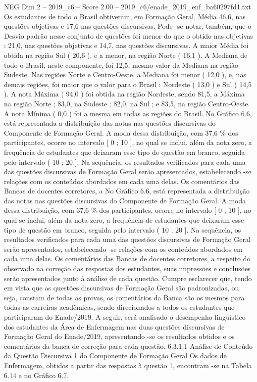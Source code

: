 \begin{textsample}{NEG Dim 2 – 2019\_c6 – Score 2.00 – 2019\_c6/enade\_2019\_enf\_ba60297fd1.txt}
Os estudantes de todo o Brasil obtiveram, em Formação Geral, Média 46,6, nas questões objetivas e 17,6 nas questões discursivas.
Pode -se notar, também, que o Desvio padrão nesse conjunto de questões foi menor do que o obtido nas objetivas : 21,0, nas questões objetivas e 14,7, nas questões discursivas.
A maior Média foi obtida na região Sul ( 20,6 ), e a menor, na região Norte ( 16,1 ).
A Mediana de todo o Brasil, neste componente, foi 12,5, mesmo valor da Mediana na região Sudeste.
Nas regiões Norte e Centro-Oeste, a Mediana foi menor ( 12,0 ), e, nas demais regiões, foi maior que o valor para o Brasil : Nordeste ( 13,0 ) e Sul ( 14,5 ).
A nota Máxima ( 94,0 ) foi obtida na região Nordeste, sendo 81,5, a Máxima na região Norte ; 83,0, na Sudeste ; 82,0, na Sul ; e 83,5, na região Centro-Oeste.
A nota Mínima ( 0,0 ) foi a mesma em todas as regiões do Brasil.
No Gráfico 6.6, está representada a distribuição das notas nas questões discursivas do Componente de Formação Geral.
A moda dessa distribuição, com 37,6 \% dos participantes, ocorre no intervalo [ 0 ; 10 ], no qual se inclui, além da nota zero, a frequência de estudantes que deixaram esse tipo de questão em branco, seguida pelo intervalo ( 10 ; 20 ].
Na sequência, os resultados verificados para cada uma das questões discursivas de Formação Geral serão apresentados, estabelecendo -se relações com os conteúdos abordados em cada uma delas.
Os comentários das Bancas de docentes corretores, a No Gráfico 6.6, está representada a distribuição das notas nas questões discursivas do Componente de Formação Geral.
A moda dessa distribuição, com 37,6 \% dos participantes, ocorre no intervalo [ 0 ; 10 ], no qual se inclui, além da nota zero, a frequência de estudantes que deixaram esse tipo de questão em branco, seguida pelo intervalo ( 10 ; 20 ].
Na sequência, os resultados verificados para cada uma das questões discursivas de Formação Geral serão apresentados, estabelecendo -se relações com os conteúdos abordados em cada uma delas.
Os comentários das Bancas de docentes corretores, a respeito do observado na correção das respostas dos estudantes, suas impressões e conclusões serão apresentados junto à análise de cada questão.
Cumpre esclarecer que, tendo em vista que as questões discursivas de Formação Geral são padronizadas, ou seja, constam de todas as provas, os comentários da Banca são os mesmos para todas as carreiras acadêmicas, sendo direcionados a todos os estudantes que participaram do Enade/2019.
A seguir, será analisado o desempenho linguístico dos estudantes da Área de Enfermagem nas duas questões discursivas de Formação Geral do Enade/2019, apresentando -se os resultados obtidos e os comentários da banca de correção para cada questão. 6.3.1.1 Análise de Conteúdo da Questão Discursiva 1 do Componente de Formação Geral Os dados de Enfermagem, obtidos a partir das respostas à questão 1, encontram -se na Tabela 6.14 e no Gráfico 6.7.

\end{textsample}
